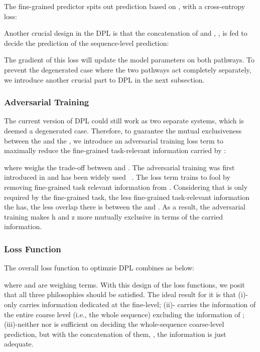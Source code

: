 \documentclass[11pt]{article}
\begin{document}
The fine-grained predictor  spits out prediction based on , with a cross-entropy loss: 





Another crucial design in the DPL is that the concatenation of  and , , is fed to decide the prediction of the sequence-level prediction:



The gradient of this loss will update the model parameters on both pathways. To prevent the degenerated case where the two pathways act completely separately, we introduce another crucial part to DPL in the next subsection.


\subsubsection{Adversarial Training}
The current version of DPL could still work as two separate systems, which is deemed a degenerated case.
Therefore, to guarantee the mutual exclusiveness between the  and the , we introduce an adversarial training loss term to maximally reduce the fine-grained task-relevant information carried by :





where  weighs the trade-off between  and .
The adversarial training was first introduced in \citet{lample2017fader} and has been widely used ~\cite{zhao2018adversarially,fu2018style,shen2017style,melnyk2017improved}.
The loss term trains  to fool  by removing fine-grained task relevant information from .
Considering that  is only required by the fine-grained task, the less fine-grained task-relevant information the  has, the less overlap there is between the  and .
As a result, the adversarial training makes h and z more mutually exclusive in terms of the carried information.


\subsubsection{Loss Function}
The overall loss function to optimzie DPL combines as below:

where  and  are weighing terms.
With this design of the loss functions, we posit that all three philosophies should be satisfied. The ideal result for it is that (i)- only carries information dedicated at the fine-level; (ii)- carries the information of the entire coarse level (i.e., the whole sequence) excluding the information of ; (iii)-neither  nor  is sufficient on deciding the whole-sequence coarse-level prediction, but with the concatenation of them, , the information is just adequate.
\end{document}
